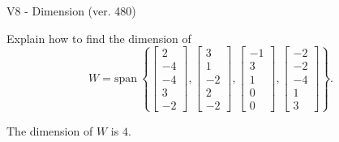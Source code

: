 \begin{exercise}
  \begin{exerciseTitle}V8 - Dimension (ver. 480)\end{exerciseTitle}
  \begin{exerciseStatement}
    Explain how to find the dimension of 
\[W=\mathrm{span}\ \left\{\left[\begin{array}{r}
2 \\
-4 \\
-4 \\
3 \\
-2
\end{array}\right] , \left[\begin{array}{r}
3 \\
1 \\
-2 \\
2 \\
-2
\end{array}\right] , \left[\begin{array}{r}
-1 \\
3 \\
1 \\
0 \\
0
\end{array}\right] , \left[\begin{array}{r}
-2 \\
-2 \\
-4 \\
1 \\
3
\end{array}\right]\right\}.\]



  \end{exerciseStatement}
  \begin{exerciseAnswer}
   The dimension of \(W\) is  \(4\).
  


  \end{exerciseAnswer}
\end{exercise}